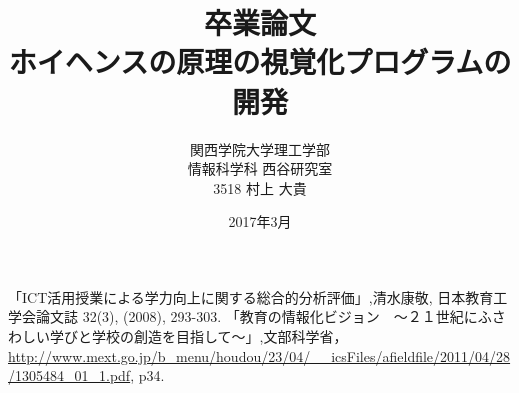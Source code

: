 \documentclass[12pt,a4]{jreport}%
\title{卒業論文\\ホイヘンスの原理の視覚化プログラムの開発}
\author{関西学院大学理工学部\\情報科学科 西谷研究室\\3518 村上 大貴}
\date{2017年3月}
\begin{document}
\maketitle
\newpage



\tableofcontents




\begin{thebibliography}{9}
「ICT活用授業による学力向上に関する総合的分析評価」,清水康敬, 日本教育工学会論文誌 32(3), (2008), 293-303.
「教育の情報化ビジョン　〜２１世紀にふさわしい学びと学校の創造を目指して〜」,文部科学省，\url{http://www.mext.go.jp/b_menu/houdou/23/04/__icsFiles/afieldfile/2011/04/28/1305484_01_1.pdf}, p34.
\end{thebibliography}
\end{document}

